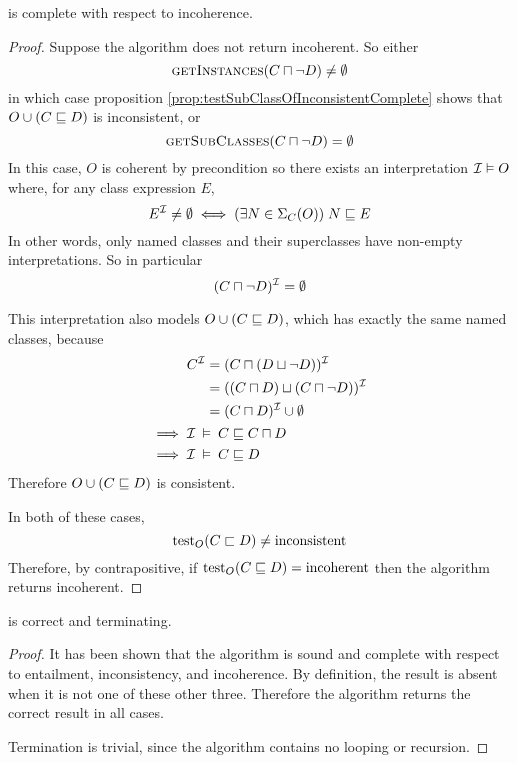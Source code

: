\documentclass[paper.tex]{subfiles}
\begin{document}
\begin{proposition}
  \label{prop:testSubClassOfIncoherentComplete}
   is complete with respect to incoherence.
\end{proposition}
\begin{proof}
  Suppose the algorithm does not return incoherent.  So either
  \[ \Call{getInstances}{C \sqcap \neg D} \ne \emptyset \]
  in which case proposition \ref{prop:testSubClassOfInconsistentComplete} shows that $O \cup (C \sqsubseteq D)$ is inconsistent, or
  \[ \Call{getSubClasses}{C \sqcap \neg D} = \emptyset \]
  In this case, $O$ is coherent by precondition so there exists an interpretation $\mathcal{I} \vDash O$ where, for any class expression $E$,
  \[ E^{\mathcal{I}} \ne \emptyset \iff (\exists N \in \Sigma_C(O)) \; N \sqsubseteq E \]
  In other words, only named classes and their superclasses have non-empty interpretations.  So in particular
  \[ (C \sqcap \neg D)^{\mathcal{I}} = \emptyset \]

  This interpretation also models $O \cup (C \sqsubseteq D)$, which has exactly the same named classes, because
  \begin{align*}
    & \begin{aligned}
      C^{\mathcal{I}} &= (C \sqcap (D \sqcup \neg D))^{\mathcal{I}} \\
      &= ((C \sqcap D) \sqcup (C \sqcap \neg D))^{\mathcal{I}} \\
      &= (C \sqcap D)^{\mathcal{I}} \cup \emptyset
    \end{aligned} \\
    \implies{}& \mathcal{I} \:\vDash\: C \sqsubseteq C \sqcap D \\
    \implies{}& \mathcal{I} \:\vDash\: C \sqsubseteq D
  \end{align*}
  Therefore $O \cup (C \sqsubseteq D)$ is consistent.

  In both of these cases,
  \[ \operatorname{test}_O(C \sqsubset D) \ne \mathrm{inconsistent} \]
  Therefore, by contrapositive, if $\operatorname{test}_O(C \sqsubseteq D) = \mathrm{incoherent}$ then the algorithm returns incoherent.
\end{proof}

\begin{theorem}
   is correct and terminating.
\end{theorem}
\begin{proof}
  It has been shown that the algorithm is sound and complete with respect to entailment, inconsistency, and incoherence.  By definition, the result is absent when it is not one of these other three.  Therefore the algorithm returns the correct result in all cases.

  Termination is trivial, since the algorithm contains no looping or recursion.
\end{proof}
\end{document}
